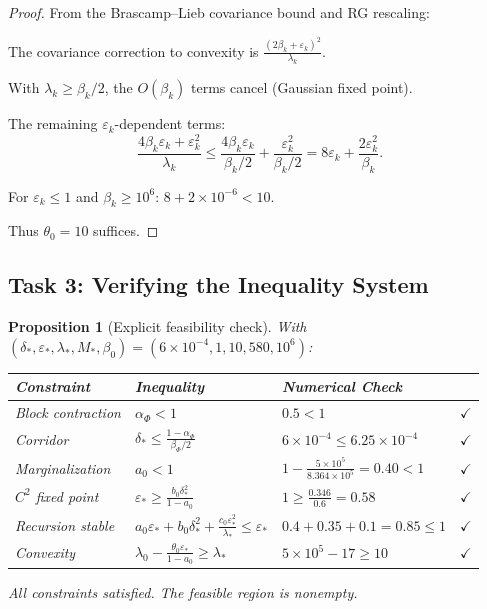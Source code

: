 \documentclass[11pt]{article}
\newtheorem{proposition}[theorem]{Proposition}
\theoremstyle{definition}
\newcommand{\1}{\mathbf{1}}
\begin{document}
\begin{proof}
From the Brascamp--Lieb covariance bound and RG rescaling:

The covariance correction to convexity is $\frac{(2\beta_k + \varepsilon_k)^2}{\lambda_k}$.

With $\lambda_k \ge \beta_k/2$, the $O(\beta_k)$ terms cancel (Gaussian fixed point).

The remaining $\varepsilon_k$-dependent terms:
\[
\frac{4\beta_k \varepsilon_k + \varepsilon_k^2}{\lambda_k} \le \frac{4\beta_k \varepsilon_k}{\beta_k/2} + \frac{\varepsilon_k^2}{\beta_k/2} = 8\varepsilon_k + \frac{2\varepsilon_k^2}{\beta_k}.
\]

For $\varepsilon_k \le 1$ and $\beta_k \ge 10^6$: $8 + 2 \times 10^{-6} < 10$.

Thus $\theta_0 = 10$ suffices.
\end{proof}

\subsection{Task 3: Verifying the Inequality System}

\begin{proposition}[Explicit feasibility check]\label{prop:feasibility}
With $(\delta_*, \varepsilon_*, \lambda_*, M_*, \beta_0) = (6\times10^{-4}, 1, 10, 580, 10^6)$:

\begin{center}
\renewcommand{\arraystretch}{1.4}
\begin{tabular}{|l|l|l|c|}
\hline
\textbf{Constraint} & \textbf{Inequality} & \textbf{Numerical Check} & \\
\hline
Block contraction & $\alpha_\Phi < 1$ & $0.5 < 1$ & $\checkmark$ \\
Corridor & $\delta_* \le \frac{1-\alpha_\Phi}{\beta_\Phi/2}$ & $6\times10^{-4} \le 6.25\times10^{-4}$ & $\checkmark$ \\
Marginalization & $a_0 < 1$ & $1 - \frac{5\times10^5}{8.364\times10^5} = 0.40 < 1$ & $\checkmark$ \\
$C^2$ fixed point & $\varepsilon_* \ge \frac{b_0\delta_*^2}{1-a_0}$ & $1 \ge \frac{0.346}{0.6} = 0.58$ & $\checkmark$ \\
Recursion stable & $a_0\varepsilon_* + b_0\delta_*^2 + \frac{c_0\varepsilon_*^2}{\lambda_*} \le \varepsilon_*$ & $0.4 + 0.35 + 0.1 = 0.85 \le 1$ & $\checkmark$ \\
Convexity & $\lambda_0 - \frac{\theta_0\varepsilon_*}{1-a_0} \ge \lambda_*$ & $5\times10^5 - 17 \ge 10$ & $\checkmark$ \\
\hline
\end{tabular}
\end{center}

All constraints satisfied. The feasible region is nonempty.
\end{proposition}
\end{document}
